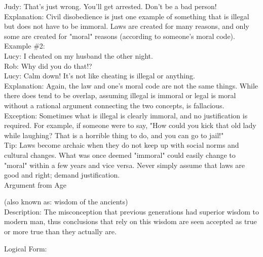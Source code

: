 \documentclass[a4paper,12pt,single,pdftex]{scrbook}
\begin{document}
    
      Judy: That's just wrong. You'll get arrested. Don't be a bad person!
    \\

    
      Explanation: Civil disobedience is just one example of something that is illegal but does not have to be immoral. Laws are created for many reasons, and only some are created for "moral" reasons (according to someone's moral code).
    \\

    
      Example \#2:
    \\

    
      Lucy: I cheated on my husband the other night.
    \\

    
      Rob: Why did you do that!?
    \\

    
      Lucy: Calm down! It's not like cheating is illegal or anything.
    \\

    
      Explanation: Again, the law and one's moral code are not the same things. While there does tend to be overlap, assuming illegal is immoral or legal is moral without a rational argument connecting the two concepts, is fallacious.
    \\

    
      Exception: Sometimes what is illegal is clearly immoral, and no justification is required. For example, if someone were to say, "How could you kick that old lady while laughing? That is a horrible thing to do, and you can go to jail!"
    \\

    
      Tip: Laws become archaic when they do not keep up with social norms and cultural changes. What was once deemed "immoral" could easily change to "moral" within a few years and vice versa. Never simply assume that laws are good and right; demand justification.
    \\

  

Argument from Age
    
      (also known as: wisdom of the ancients)
    \\

  
    Description: The misconception that previous generations had superior wisdom to modern man, thus conclusions that rely on this wisdom are seen accepted as true or more true than they actually are.

    
      Logical Form:
    \\
\end{document}
